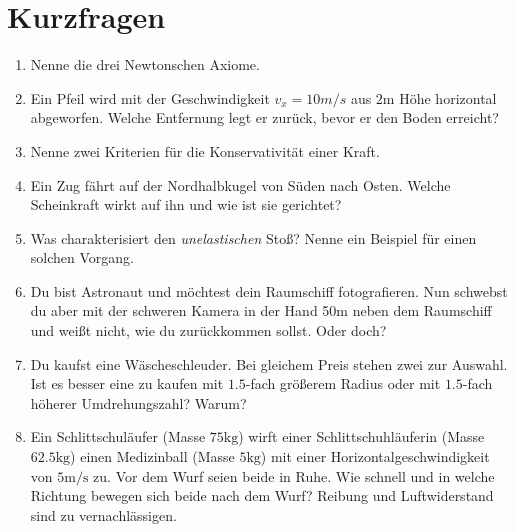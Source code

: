 \section{Kurzfragen}
\begin{enumerate}

  \item Nenne die drei Newtonschen Axiome.
  \item Ein Pfeil wird mit der Geschwindigkeit $v_x = 10 m/s$ aus $2\si{\meter}$ Höhe horizontal abgeworfen. Welche
        Entfernung legt er zurück, bevor er den Boden erreicht?
  \item Nenne zwei Kriterien für die Konservativität einer Kraft.
  \item Ein Zug fährt auf der Nordhalbkugel von Süden nach Osten. Welche Scheinkraft wirkt auf ihn und wie ist sie gerichtet?
  \item Was charakterisiert den \emph{unelastischen} Stoß? Nenne ein Beispiel für einen solchen Vorgang.
  \item Du bist Astronaut und möchtest dein Raumschiff fotografieren. Nun schwebst du aber mit der schweren Kamera in der Hand 50m
        neben dem Raumschiff und weißt nicht, wie du zurückkommen sollst. Oder doch?
  \item Du kaufst eine Wäscheschleuder. Bei gleichem Preis stehen zwei zur Auswahl.  Ist es besser eine zu kaufen mit $1.5$-fach
        größerem Radius oder mit $1.5$-fach höherer Umdrehungszahl? Warum?
  \item Ein Schlittschuläufer (Masse $75\si{\kilo\gram}$) wirft einer Schlittschuhläuferin (Masse $62.5\si{\kilo\gram}$) einen
        Medizinball (Masse $5\si{\kilo\gram}$) mit einer Horizontalgeschwindigkeit von $5\si{\meter\per\second}$ zu. Vor dem Wurf
        seien beide in Ruhe. Wie schnell und in welche Richtung bewegen sich beide nach dem Wurf? Reibung und Luftwiderstand sind
        zu vernachlässigen.
\end{enumerate}

\newpage
